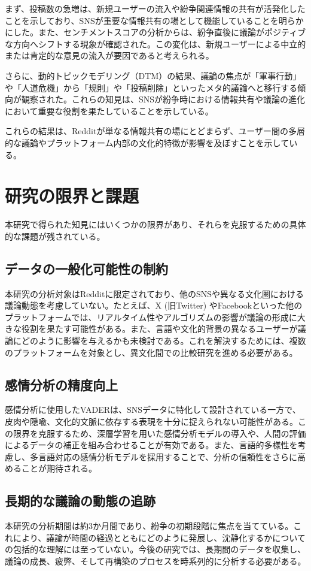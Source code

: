 \documentclass[11pt, a4j]{jreport}
\begin{document}
    まず、投稿数の急増は、新規ユーザーの流入や紛争関連情報の共有が活発化したことを示しており、SNSが重要な情報共有の場として機能していることを明らかにした。また、センチメントスコアの分析からは、紛争直後に議論がポジティブな方向へシフトする現象が確認された。この変化は、新規ユーザーによる中立的または肯定的な意見の流入が要因であると考えられる。
    
    さらに、動的トピックモデリング（DTM）の結果、議論の焦点が「軍事行動」や「人道危機」から「規則」や「投稿削除」といったメタ的議論へと移行する傾向が観察された。これらの知見は、SNSが紛争時における情報共有や議論の進化において重要な役割を果たしていることを示している。

    これらの結果は、Redditが単なる情報共有の場にとどまらず、ユーザー間の多層的な議論やプラットフォーム内部の文化的特徴が影響を及ぼすことを示している。

    \section{研究の限界と課題}
    本研究で得られた知見にはいくつかの限界があり、それらを克服するための具体的な課題が残されている。

    \subsection{データの一般化可能性の制約}
    本研究の分析対象はRedditに限定されており、他のSNSや異なる文化圏における議論動態を考慮していない。たとえば、X (旧Twitter) やFacebookといった他のプラットフォームでは、リアルタイム性やアルゴリズムの影響が議論の形成に大きな役割を果たす可能性がある。また、言語や文化的背景の異なるユーザーが議論にどのように影響を与えるかも未検討である。これを解決するためには、複数のプラットフォームを対象とし、異文化間での比較研究を進める必要がある。

    \subsection{感情分析の精度向上}
    感情分析に使用したVADERは、SNSデータに特化して設計されている一方で、皮肉や隠喩、文化的文脈に依存する表現を十分に捉えられない可能性がある。この限界を克服するため、深層学習を用いた感情分析モデルの導入や、人間の評価によるデータの補正を組み合わせることが有効である。また、言語的多様性を考慮し、多言語対応の感情分析モデルを採用することで、分析の信頼性をさらに高めることが期待される。

    \subsection{長期的な議論の動態の追跡}
    本研究の分析期間は約3か月間であり、紛争の初期段階に焦点を当てている。これにより、議論が時間の経過とともにどのように発展し、沈静化するかについての包括的な理解には至っていない。今後の研究では、長期間のデータを収集し、議論の成長、疲弊、そして再構築のプロセスを時系列的に分析する必要がある。
\end{document}
